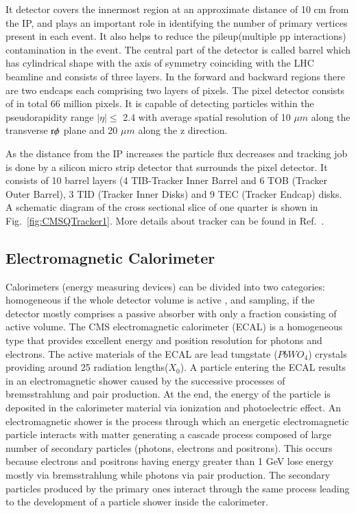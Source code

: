It detector covers the innermost region at an approximate distance of 10 cm from the IP, and plays an important role in identifying the number of primary vertices present in each event. It also helps to reduce the pileup(multiple pp interactions) contamination in the event. The central part of the detector is called barrel which has cylindrical shape with the axis of symmetry coinciding with the LHC beamline and consists of three layers. In the forward and backward regions there are two endcaps each comprising two layers of pixels. The pixel detector consists of in total 66 million pixels. It is capable of detecting particles within the  pseudorapidity range $|\eta| \leq$ 2.4 with average spatial resolution of 10 $\mu m$ along the transverse $\rm r\phi$ plane and 20 $\mu m $ along the z direction.

As the distance from the IP increases the particle flux decreases and tracking job is done by a silicon micro strip detector that surrounds the pixel detector. It consists of 10 barrel layers (4 TIB-Tracker Inner Barrel and 6 TOB (Tracker Outer Barrel), 3 TID (Tracker Inner Disks)  and 9 TEC (Tracker Endcap) disks. A schematic diagram of the cross sectional slice of one quarter is shown in Fig.~\ref{fig:CMSQTracker1}. More details about tracker can be found in Ref.~\cite{physics-tdr-8.1}.  


\subsection{Electromagnetic Calorimeter}

Calorimeters (energy measuring devices) can be divided into two categories: homogeneous if the whole detector volume is active , and sampling, if the detector mostly comprises a passive absorber with only a fraction consisting of active volume. The CMS electromagnetic calorimeter (ECAL) is a homogeneous type that provides excellent energy and position resolution for photons and electrons. The active materials of the ECAL are lead tungstate ($PbWO_{4}$)  crystals providing around 25 radiation lengths($X_{0}$). A particle entering the ECAL results in an electromagnetic shower caused by the successive processes of bremsstrahlung and pair production. At the end, the energy of the particle is deposited in the calorimeter material via ionization and photoelectric effect. An electromagnetic shower is the process through which an energetic electromagnetic particle interacts with matter generating a cascade process composed of large number of secondary particles (photons, electrons and positrons). This occurs because electrons and positrons having energy greater than 1 GeV lose energy mostly via bremsstrahlung while photons via pair production. The secondary particles produced by the primary ones interact through the same process leading to the development of a particle shower inside the calorimeter. 


